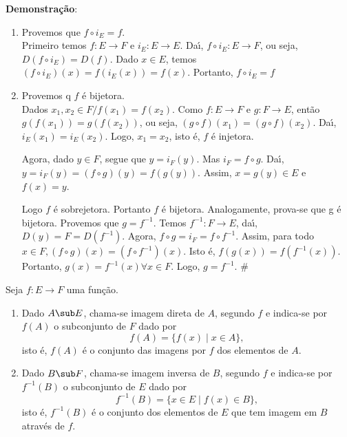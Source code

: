 \textbf{Demonstra{\c c}{\~a}o}:
\begin{enumerate}
\item Provemos que $f\circ i_{E}=f$.\\
Primeiro temos $f:E\rightarrow F$ e $i_{E}:E\rightarrow E$. Da{\'\i}, $f\circ i_{E}:E\rightarrow F$, ou seja, $D(f\circ i_{E})=D(f)$. Dado $x\in E$, temos $(f\circ i_{E})(x)=f(i_{E}(x))=f(x)$. Portanto, $f\circ i_{E}=f$
\item Provemos q $f$ {\'e} bijetora.\\
Dados $x_{1},x_{2}\in F/f(x_{1})=f(x_{2})$. Como $f:E\rightarrow F$ e $g:F\rightarrow E$, ent{\~a}o $g(f(x_{1}))=g(f(x_{2}))$, ou seja, $(g\circ f)(x_{1})=(g\circ f)(x_{2})$. Da{\'\i}, $i_{E}(x_{1})=i_{E}(x_{2})$. Logo, $x_{1}=x_{2}$, isto {\'e}, $f$ {\'e} injetora.

Agora, dado $y\in F$, segue que $y=i_{F}(y)$. Mas $i_{F}=f\circ g$. Da{\'\i}, $y=i_{F}(y)=(f\circ g)(y)=f(g(y))$. Assim, $x=g(y)\in E$ e $f(x)=y$.

Logo $f$ {\'e} sobrejetora. Portanto $f$ {\'e} bijetora. Analogamente, prova-se que g {\'e} bijetora. Provemos que $g=f^{-1}$. Temos  $f^{-1}:F\rightarrow E$, da{\'\i}, $D(y)=F=D(f^{-1})$. Agora, $f\circ g=i_{F}=f\circ f^{-1}$. Assim, para todo $x\in F, (f\circ g)(x)=(f\circ f^{-1})(x)$. Isto {\'e}, $f(g(x))=f(f^{-1}(x))$. Portanto, $g(x)=f^{-1}(x)\forall x\in F$. Logo, $g=f^{-1}$. \#
\end{enumerate}

\begin{definicao}
Seja $f : E \to F$ uma fun{\c c}{\~a}o.
\begin{enumerate}
\item Dado $A \sub E$, chama-se {\rm imagem direta} de $A$, segundo $f$ e indica-se por $f(A)$ o subconjunto de $F$ dado por
\[
f(A) = \{f(x) \mid x \in A\},
\]
isto {\'e}, $f(A)$ {\'e} o conjunto das imagens por $f$ dos elementos de $A$.

\item Dado $B \sub F$, chama-se {\rm imagem inversa} de $B$, segundo $f$ e indica-se por $f^{-1}(B)$ o subconjunto de $E$ dado por
\[
f^{-1}(B) = \{x \in E \mid f(x) \in B\},
\]
isto {\'e}, $f^{-1}(B)$ {\'e} o conjunto dos elementos de $E$ que tem imagem em $B$ atrav{\'e}s de $f$.
\end{enumerate}
\end{definicao}

